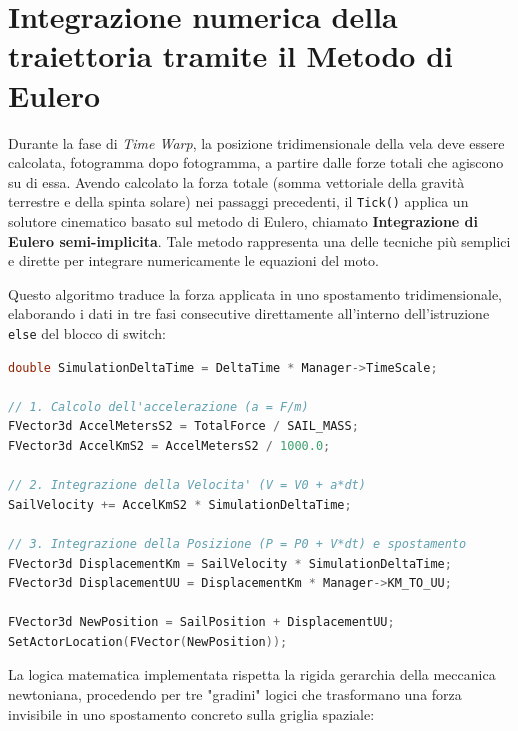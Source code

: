 \section{Integrazione numerica della traiettoria tramite il Metodo di Eulero}

Durante la fase di \textit{Time Warp}, la posizione tridimensionale della vela deve essere calcolata, fotogramma dopo fotogramma, a partire dalle forze totali che agiscono su di essa.
Avendo calcolato la forza totale (somma vettoriale della gravità terrestre e della spinta solare) nei passaggi precedenti, il \lstinline|Tick()| applica un solutore cinematico basato sul metodo di Eulero, chiamato \textbf{Integrazione di Eulero semi-implicita}.
Tale metodo rappresenta una delle tecniche più semplici e dirette per integrare numericamente le equazioni del moto.

Questo algoritmo traduce la forza applicata in uno spostamento tridimensionale, elaborando i dati in tre fasi consecutive direttamente all'interno dell'istruzione \lstinline|else| del blocco di switch:

\begin{lstlisting}[language=C++, caption={Implementazione del solutore cinematico basato sul metodo di Eulero.}]
double SimulationDeltaTime = DeltaTime * Manager->TimeScale;

// 1. Calcolo dell'accelerazione (a = F/m)
FVector3d AccelMetersS2 = TotalForce / SAIL_MASS;
FVector3d AccelKmS2 = AccelMetersS2 / 1000.0;

// 2. Integrazione della Velocita' (V = V0 + a*dt)
SailVelocity += AccelKmS2 * SimulationDeltaTime;

// 3. Integrazione della Posizione (P = P0 + V*dt) e spostamento
FVector3d DisplacementKm = SailVelocity * SimulationDeltaTime;
FVector3d DisplacementUU = DisplacementKm * Manager->KM_TO_UU;

FVector3d NewPosition = SailPosition + DisplacementUU;
SetActorLocation(FVector(NewPosition));
\end{lstlisting}

La logica matematica implementata rispetta la rigida gerarchia della meccanica newtoniana, procedendo per tre "gradini" logici che trasformano una forza invisibile in uno spostamento concreto sulla griglia spaziale:

